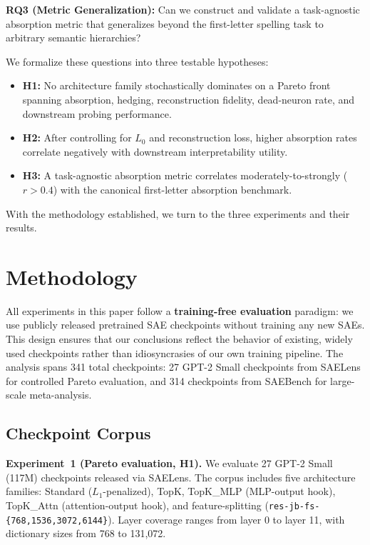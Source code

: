 \documentclass{article}
\begin{document}
\textbf{RQ3 (Metric Generalization):} Can we construct and validate a task-agnostic absorption metric that generalizes beyond the first-letter spelling task to arbitrary semantic hierarchies?

We formalize these questions into three testable hypotheses:

\begin{itemize}
    \item \textbf{H1:} No architecture family stochastically dominates on a Pareto front spanning absorption, hedging, reconstruction fidelity, dead-neuron rate, and downstream probing performance.
    \item \textbf{H2:} After controlling for $L_0$ and reconstruction loss, higher absorption rates correlate negatively with downstream interpretability utility.
    \item \textbf{H3:} A task-agnostic absorption metric correlates moderately-to-strongly ($r > 0.4$) with the canonical first-letter absorption benchmark.
\end{itemize}

With the methodology established, we turn to the three experiments and their results.

\section{Methodology}
\label{sec:method}

All experiments in this paper follow a \textbf{training-free evaluation} paradigm: we use publicly released pretrained SAE checkpoints without training any new SAEs. This design ensures that our conclusions reflect the behavior of existing, widely used checkpoints rather than idiosyncrasies of our own training pipeline. The analysis spans 341 total checkpoints: 27 GPT-2 Small checkpoints from SAELens for controlled Pareto evaluation, and 314 checkpoints from SAEBench for large-scale meta-analysis.

\subsection{Checkpoint Corpus}

\textbf{Experiment~1 (Pareto evaluation, H1).} We evaluate 27 GPT-2 Small (117M) checkpoints released via SAELens. The corpus includes five architecture families: Standard ($L_1$-penalized), TopK, TopK\_MLP (MLP-output hook), TopK\_Attn (attention-output hook), and feature-splitting (\texttt{res-jb-fs-\{768,1536,3072,6144\}}). Layer coverage ranges from layer 0 to layer 11, with dictionary sizes from 768 to 131,072.
\end{document}
